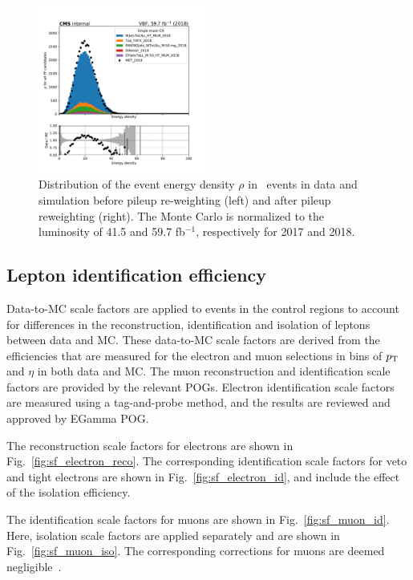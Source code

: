 \begin{figure}[ht!]
\begin{center}
    \includegraphics[width=0.49\textwidth]{Pileup/cr_1m_vbf_rho_all_2018.pdf}
    \caption{
        Distribution of the event energy density $\rho$ in \Wmn~events in data and
        simulation before pileup re-weighting (left) and after pileup reweighting (right).
        The Monte Carlo is normalized to the luminosity of 41.5 and 59.7 fb$^{-1}$, respectively for 2017 and 2018.
    }
    \label{fig:purwt_rho}
  \end{center}
\end{figure}

\clearpage

\subsection{Lepton identification efficiency}
\label{subsec:lepton_id_reweighting}

Data-to-MC scale factors are applied to events in the control regions to
account for differences in the reconstruction, identification and isolation of leptons
between data and MC. These data-to-MC scale factors are derived from the efficiencies that are measured for the electron and muon
selections in bins of $p_{\textrm{T}}$ and $\eta$ in both data and MC. The muon reconstruction and identification scale factors are
provided by the relevant POGs. Electron identification scale factors are measured using a tag-and-probe method, and the results are reviewed 
and approved by EGamma POG.

The reconstruction scale factors for electrons are shown in Fig.~\ref{fig:sf_electron_reco}. The corresponding identification scale factors for 
veto and tight electrons are shown in Fig.~\ref{fig:sf_electron_id}, and include the effect of the isolation efficiency. 

The identification scale factors for muons are shown in Fig.~\ref{fig:sf_muon_id}. Here, isolation scale factors are applied separately and are 
shown in Fig.~\ref{fig:sf_muon_iso}. The corresponding corrections for muons are deemed negligible~\cite{CMS-MUO-TWIKI-SF}.


